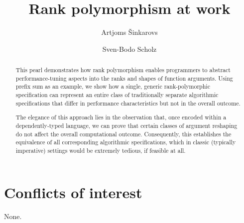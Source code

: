 \documentclass[final,pearl]{jfp-epi}
\begin{document}
\title{Rank polymorphism at work}

\author{Artjoms {\v{S}}inkarovs}
\author{Sven-Bodo Scholz}

\begin{abstract}
  This pearl demonstrates how rank polymorphism enables programmers to abstract
  per\-for\-man\-ce-tuning aspects into the ranks and shapes of function arguments.
  Using prefix sum as an example, we show how a single, generic
  rank-polymorphic specification can represent an entire class of traditionally
  separate algorithmic specifications that differ in performance
  characteristics but not in the overall outcome.

  The elegance of this approach lies in the observation that, once
  encoded within a dependently-typed language, we can prove that certain
  classes of argument reshaping do not affect the overall computational
  outcome.  Consequently, this establishes the equivalence of all corresponding
  algorithmic specifications, which in classic (typically imperative) settings
  would be extremely tedious, if feasible at all.
\end{abstract}

\maketitle








\section*{Conflicts of interest}
None.



\end{document}
